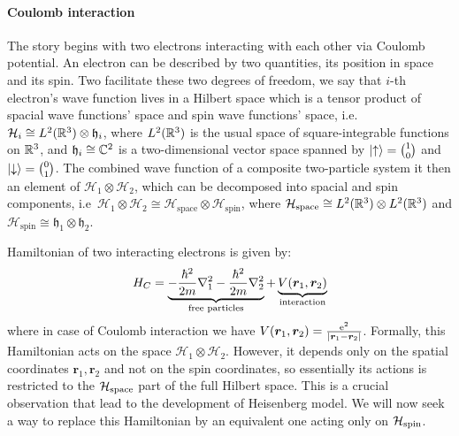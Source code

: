 \paragraph{Coulomb interaction}The story begins with two electrons interacting with each other via Coulomb potential.
An electron can be described by two quantities, its position in space and its spin.
Two facilitate these two degrees of freedom, we say that \(i\)-th electron's wave function
lives in a Hilbert space which is a tensor product of spacial 
wave functions' space and spin wave functions' space, i.e.\ \(\mathcal{H}_i \cong L^2(\mathbb{R}^3)
\otimes \mathfrak{h}_i \), where \(L^2(\mathbb{R}^3)\) is the usual space of square-integrable functions on
\(\mathbb{R}^3\), and \(\mathfrak{h}_i \cong \mathbb{C}^2\) is a two-dimensional vector space spanned by
\(\ket{\uparrow} = \binom{1}{0} \) and \(\ket{\downarrow} = \binom{0}{1}\).
The combined wave function of a composite two-particle system it then an element of
\(\mathcal{H}_1 \otimes \mathcal{H}_2\), which can be decomposed into spacial and spin
components, i.e\ \(\mathcal{H}_1 \otimes \mathcal{H}_2 \cong\mathcal{H}_{\mathrm{space}} 
\otimes \mathcal{H}_{\mathrm{spin}}\), where \(\mathcal{H}_{\mathrm{space}} 
\cong L^2(\mathbb{R}^3) \otimes L^2(\mathbb{R}^3)\) and \(\mathcal{H}_{\mathrm{spin}} \cong
\mathfrak{h}_1 \otimes \mathfrak{h}_2\). 

Hamiltonian of two interacting electrons is given by:
\begin{equation}
    H_C = \underbrace{-\frac{\hbar^2}{2m} \laplacian_1  
    -\frac{\hbar^2}{2m} \laplacian_2 }_{\textrm{free particles}}
     + \underbrace{V(\bm{r}_1,\bm{r}_2)}_{\textrm{interaction}}
     \label{eq:Coulomb Hamiltonian}
\end{equation}
where in case of Coulomb interaction we have \(V(\bm{r}_1,\bm{r}_2)=\frac{\mathrm{e}^2}
{\abs{\bm{r}_1-\bm{r}_2}}\).
Formally, this Hamiltonian acts on the space \(\mathcal{H}_1 \otimes \mathcal{H}_2\).
However, it depends only on the spatial coordinates \(\bm{r}_1,\bm{r}_2\) and not on
the spin coordinates, so essentially
its actions is restricted to the \(\mathcal{H}_{\textrm{space}}\) part of the full Hilbert space.
This is a crucial observation that lead to the development of Heisenberg model. We will now
seek a way to replace this Hamiltonian by an equivalent one acting only on 
\(\mathcal{H}_{\textrm{spin}}\).

